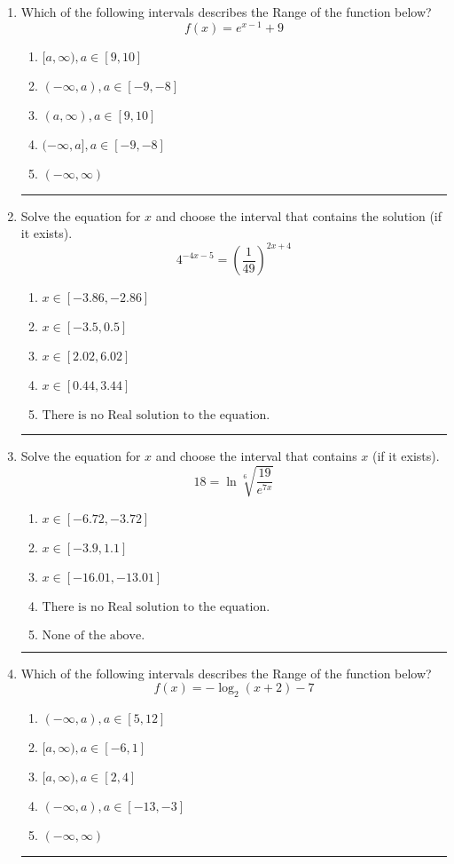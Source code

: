 \documentclass[14pt]{extbook}
\newcommand{\litem}[1]{\item#1\hspace*{-1cm}\rule{\textwidth}{0.4pt}}
\begin{document}
\begin{enumerate}
{\begin{enumerate}[label=\Alph*.]
\end{enumerate} }
\litem{
Which of the following intervals describes the Range of the function below?\[ f(x) = e^{x-1}+9 \]\begin{enumerate}[label=\Alph*.]
\item \( [a, \infty), a \in [9, 10] \)
\item \( (-\infty, a), a \in [-9, -8] \)
\item \( (a, \infty), a \in [9, 10] \)
\item \( (-\infty, a], a \in [-9, -8] \)
\item \( (-\infty, \infty) \)

\end{enumerate} }
\litem{
Solve the equation for $x$ and choose the interval that contains the solution (if it exists).\[ 4^{-4x-5} = \left(\frac{1}{49}\right)^{2x+4} \]\begin{enumerate}[label=\Alph*.]
\item \( x \in [-3.86, -2.86] \)
\item \( x \in [-3.5, 0.5] \)
\item \( x \in [2.02, 6.02] \)
\item \( x \in [0.44, 3.44] \)
\item \( \text{There is no Real solution to the equation.} \)

\end{enumerate} }
\litem{
 Solve the equation for $x$ and choose the interval that contains $x$ (if it exists).\[  18 = \ln{\sqrt[6]{\frac{19}{e^{7x}}}} \]\begin{enumerate}[label=\Alph*.]
\item \( x \in [-6.72, -3.72] \)
\item \( x \in [-3.9, 1.1] \)
\item \( x \in [-16.01, -13.01] \)
\item \( \text{There is no Real solution to the equation.} \)
\item \( \text{None of the above.} \)

\end{enumerate} }
\litem{
Which of the following intervals describes the Range of the function below?\[ f(x) = -\log_2{(x+2)}-7 \]\begin{enumerate}[label=\Alph*.]
\item \( (-\infty, a), a \in [5, 12] \)
\item \( [a, \infty), a \in [-6, 1] \)
\item \( [a, \infty), a \in [2, 4] \)
\item \( (-\infty, a), a \in [-13, -3] \)
\item \( (-\infty, \infty) \)


\end{enumerate}}
\end{enumerate}
\end{document}
